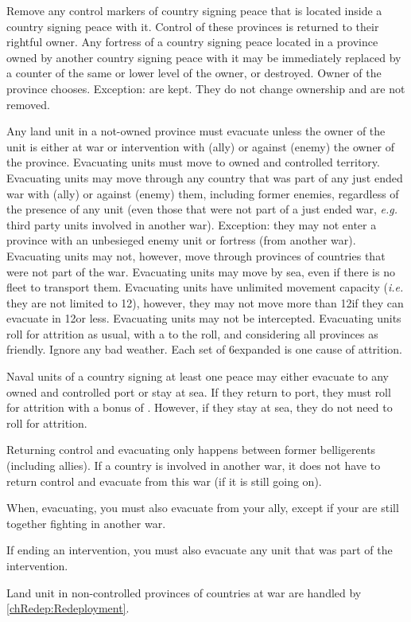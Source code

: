  Remove any control markers of country signing peace
that is located inside a country signing peace with it. Control of these
provinces is returned to their rightful owner.
\bparag Any fortress of a country signing peace located in a province owned by
another country signing peace with it may be immediately replaced by a counter
of the same or lower level of the owner, or destroyed. Owner of the province
chooses.
\bparag Exception: \Presidios are kept. They do not change ownership and are
not removed.

\label{chPeace:Evacuation}
Any land unit in a not-owned province must evacuate unless the owner of the
unit is either at war or intervention with (ally) or against (enemy) the owner
of the province.
\bparag Evacuating units must move to owned and controlled territory.
\bparag Evacuating units may move through any country that was part of any
just ended war with (ally) or against (enemy) them, including former enemies,
regardless of the presence of any unit (even those that were not part of a
just ended war, \emph{e.g.} third party units involved in another war).
\bparag Exception: they may not enter a province with an unbesieged enemy unit
or fortress (from another war).
\bparag Evacuating units may not, however, move through provinces of countries
that were not part of the war.
\bparag Evacuating units may move by sea, even if there is no fleet to
transport them.
\bparag Evacuating units have unlimited movement capacity (\emph{i.e.} they
are not limited to 12\MP), however, they may not move more than 12\MP if they
can evacuate in 12\MP or less.
\bparag Evacuating units may not be intercepted.
\bparag Evacuating units roll for attrition as usual, with a  to the
roll, and considering all provinces as friendly. Ignore any bad weather. Each
set of 6\MP expanded is one cause of attrition.

 Naval units of a country signing at least one peace
may either evacuate to any owned and controlled port or stay at sea.
\bparag If they return to port, they must roll for attrition with a bonus of
.
\bparag However, if they stay at sea, they do not need to roll for attrition.

\begin{designnote}
  Returning control and evacuating only happens between former belligerents
  (including allies). If a country is involved in another war, it does not
  have to return control and evacuate from this war (if it is still going
  on).

  When, evacuating, you must also evacuate from your ally, except if your are
  still together fighting in another war.
  
  If ending an intervention, you must also evacuate any unit that was part of
  the intervention.

  Land unit in non-controlled provinces of countries at war are handled by
  \ref{chRedep:Redeployment}.
\end{designnote}

